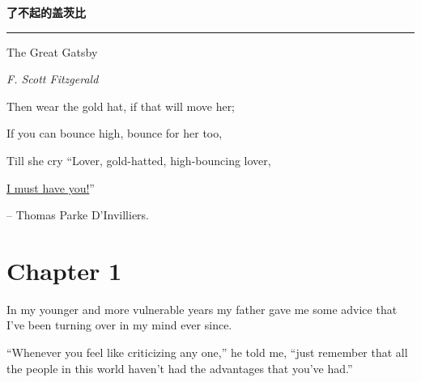 \documentclass{znotebook}
\begin{document}
\begin{titlepage}
  \vspace*{25ex}
  
  \hspace{0.05\textwidth}\begin{minipage}{.9\textwidth}
    \flushright
    
    {\textbf{了不起的盖茨比}}
    
    \rule{\linewidth}{.5pt}
    
    \vspace{2ex}
    
    {\textsf{The Great Gatsby}} \\
    
    \vspace{20ex}
    
    {\textit{F. Scott Fitzgerald}}
  \end{minipage}
\end{titlepage}
\thispagestyle{empty}


\frontmatter


\clearpage
{
  \hypersetup{hidelinks}
  \tableofcontents
}

\cleardoublepage

Then wear the gold hat, if that will move her;

If you can bounce high, bounce for her too,

Till she cry ``Lover, gold-hatted, high-bouncing lover,

\uline{I must have you!}'' 

-- Thomas Parke D’Invilliers.



\mainmatter


\chapter{Chapter 1}

In my younger and more vulnerable years my father gave me some advice that I’ve been turning over in my mind ever since.

``Whenever you feel like criticizing any one,'' he told me, ``just remember that all the people in this world haven’t had the advantages that you’ve had.''
\end{document}
